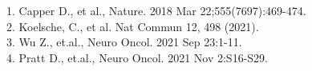 1.  Capper D., et al., Nature. 2018 Mar 22;555(7697):469-474.\\
2.  Koelsche, C., et al. Nat Commun 12, 498 (2021).\\
3.  Wu Z., et.al., Neuro Oncol. 2021 Sep 23:1-11.\\
4.  Pratt D., et.al., Neuro Oncol. 2021 Nov 2:S16-S29.\\
